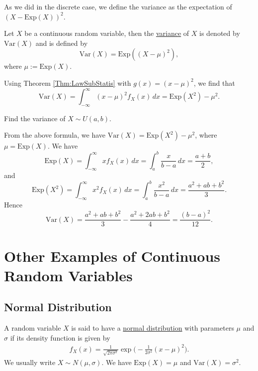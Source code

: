As we did in the discrete case, we define the variance as the expectation of $(X - \mathrm{Exp} (X))^2$.

\begin{definition}
Let $X$ be a continuous random variable, then the \underline{variance} of $X$ is denoted by $\mathrm{Var} (X)$ and is defined by
    \[
        \mathrm{Var} (X) = \mathrm{Exp} ( (X - \mu )^2 ) ,
    \]
where $\mu := \mathrm{Exp} (X)$. 
\end{definition}

Using Theorem \ref{Thm:LawSubStatis} with $g (x) = (x - \mu)^2$, we find that
    \[
        \mathrm{Var} (X) = \int_{-\infty}^\infty (x - \mu )^2 f_X (x) \, dx = \mathrm{Exp} (X^2) - \mu^2 .
    \]

\begin{example}
Find the variance of $X \sim U (a, b)$. 
\end{example}

\begin{sol*}
From the above formula, we have $\mathrm{Var} (X) = \mathrm{Exp} (X^2 ) - \mu^2$, where $\mu = \mathrm{Exp} (X)$. We have
    \[
        \mathrm{Exp} (X) = \int_{-\infty}^\infty xf_X (x) \, dx = \int_a^b \frac{x}{b-a} \, dx = \frac{a + b}{2} ,
    \]
and
    \[
        \mathrm{Exp} (X^2) = \int_{-\infty}^\infty x^2 f_X (x) \, dx = \int_a^b \frac{x^2}{b- a} \, dx = \frac{a^2 + ab + b^2}{3} .
    \]
Hence
    \[
        \mathrm{Var} (X) = \frac{a^2 + ab + b^2}{3} - \frac{a^2 + 2ab + b^2}{4} = \frac{(b - a)^2}{12} . \tag*{$\triangle$} 
    \]
\end{sol*}

\section{Other Examples of Continuous Random Variables}

\subsection*{Normal Distribution}

A random variable $X$ is said to have a \underline{normal distribution} with parameters $\mu$ and $\sigma$ if its density function is given by
    \begin{align*}
    f_X (x) = \frac{1}{\sqrt{2\pi \sigma^2}} \exp \Big( -\frac{1}{2 \sigma^2} (x - \mu )^2 \Big) .
    \end{align*}
We usually write $X \sim N (\mu , \sigma )$. We have $\mathrm{Exp} (X) = \mu$ and $\mathrm{Var} (X) = \sigma^2$. 

